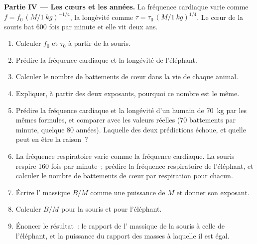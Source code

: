 \begin{problem}
\medskip
\noindent\textbf{Partie IV --- Les cœurs et les années.}
La fréquence cardiaque varie comme $f = f_0\,(M/\qty{1}{kg})^{-1/4}$, la
longévité comme $\tau = \tau_0\,(M/\qty{1}{kg})^{1/4}$. Le cœur de la
souris bat \qty{600}{} fois par minute et elle vit deux ans.
\begin{enumerate}[resume]
  \item Calculer $f_0$ et $\tau_0$ à partir de la souris.
  \item Prédire la fréquence cardiaque et la longévité de l'éléphant.
  \item Calculer le nombre de battements de cœur dans la vie de chaque
        animal.
  \item Expliquer, à partir des deux exposants, pourquoi ce nombre est
        le même.
  \item Prédire la fréquence cardiaque et la longévité d'un humain de
        \qty{70}{kg} par les mêmes formules, et comparer avec les
        valeurs réelles (\qty{70}{} battements par minute, quelque
        \qty{80}{} années). Laquelle des deux prédictions échoue, et
        quelle peut en être la raison~?
  \item La fréquence respiratoire varie comme la fréquence cardiaque. La
        souris respire \qty{160}{} fois par minute~; prédire la
        fréquence respiratoire de l'éléphant, et calculer le nombre de
        battements de cœur par respiration pour chacun.
  \item Écrire l' massique $B/M$ comme une
        puissance de $M$ et donner son exposant.
  \item Calculer $B/M$ pour la souris et pour l'éléphant.
  \item Énoncer le résultat~: le rapport de l'
        massique de la souris à celle de l'éléphant, et la puissance du
        rapport des masses à laquelle il est égal.
\end{enumerate}
\end{problem}
